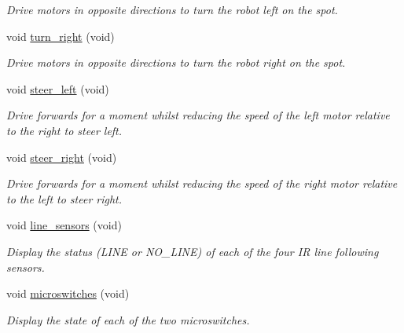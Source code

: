 \begin{DoxyCompactItemize}
\begin{DoxyCompactList}\small\item\em Drive motors in opposite directions to turn the robot left on the spot. \item\end{DoxyCompactList}\item 
void \hyperlink{classIDP_1_1SelfTests_a4e4b66ddff2de3444f1e9383dcf463a6}{turn\_\-right} (void)
\begin{DoxyCompactList}\small\item\em Drive motors in opposite directions to turn the robot right on the spot. \item\end{DoxyCompactList}\item 
void \hyperlink{classIDP_1_1SelfTests_ae54bd0e6c01c5d1d794363cc676dbb92}{steer\_\-left} (void)
\begin{DoxyCompactList}\small\item\em Drive forwards for a moment whilst reducing the speed of the left motor relative to the right to steer left. \item\end{DoxyCompactList}\item 
void \hyperlink{classIDP_1_1SelfTests_a7f9c5999de2e7c4f59c8c5a60965e876}{steer\_\-right} (void)
\begin{DoxyCompactList}\small\item\em Drive forwards for a moment whilst reducing the speed of the right motor relative to the left to steer right. \item\end{DoxyCompactList}\item 
void \hyperlink{classIDP_1_1SelfTests_aa73ad4de6c1d2b725ed796c10f54ab7c}{line\_\-sensors} (void)
\begin{DoxyCompactList}\small\item\em Display the status (LINE or NO\_\-LINE) of each of the four IR line following sensors. \item\end{DoxyCompactList}\item 
void \hyperlink{classIDP_1_1SelfTests_a6b2e4d0517de4b73c63f1b1a475b602f}{microswitches} (void)
\begin{DoxyCompactList}\small\item\em Display the state of each of the two microswitches. \item\end{DoxyCompactList}\item 

\end{DoxyCompactItemize}
